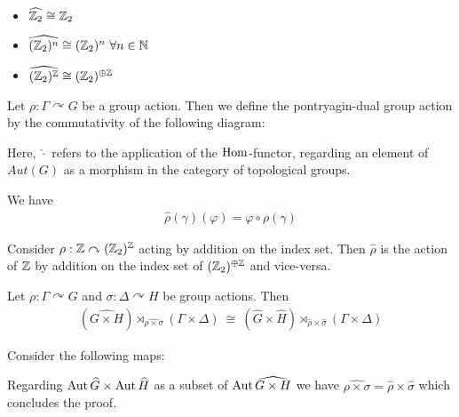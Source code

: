 \begin{Example}
	\label{the_zero_divisor_problem:pontryagin_duality:example_duals}
	\
	\begin{itemize}
		\item {$\widehat{\mathbb{Z}_2} \cong \mathbb{Z}_2$}
		\item {$\widehat{(\mathbb{Z}_2)^n} \cong (\mathbb{Z}_2)^n ~\forall n \in \mathbb{N}$}
		\item {$\widehat{(\mathbb{Z}_2)^{\mathbb{Z}}} \cong (\mathbb{Z}_2)^{\oplus \mathbb{Z}}$}
	\end{itemize}
\end{Example}

\begin{Definition}
	Let $\rho: \Gamma \curvearrowright G$ be a group action.
	Then we define the {pontryagin-dual group action} by the commutativity of the following diagram:
	\begin{figure}[H]
		\centering
		
	\end{figure}
	Here, $\widehat{\cdot}$ refers to the application of the $\operatorname{Hom}$-functor, regarding an element of $Aut(G)$ as a morphism in the category of topological groups.
\end{Definition}
\begin{Remark}
	We have
	\begin{align*}
		\widehat{\rho}(\gamma)(\varphi) = \varphi \circ \rho(\gamma)
	\end{align*}
\end{Remark}
\begin{Example}
	\label{the_zero_divisor_problem:pontryagin_duality:example_dual_action}
	Consider $\rho: \mathbb{Z} \curvearrowright (\mathbb{Z}_2)^{\mathbb{Z}}$ acting by addition on the index set.
	Then $\widehat{\rho}$ is the action of $\mathbb{Z}$ by addition on the index set of $(\mathbb{Z}_2)^{\oplus \mathbb{Z}}$ and vice-versa.
\end{Example}

\begin{Lemma}
	\label{the_zero_divisor_problem:pontryagin_duality:lemma_product_of_dual_group_actions}
	Let $\rho: \Gamma \curvearrowright G$ and $\sigma: \Delta \curvearrowright H$ be group actions. Then
	\begin{align*}
		(\widehat{G \times H}) \rtimes_{\widehat{\rho \times \sigma}} (\Gamma \times \Delta) ~\cong~ (\widehat{G} \times \widehat{H}) \rtimes_{\widehat{\rho} \times \widehat{\sigma}} (\Gamma \times \Delta)
	\end{align*}
\end{Lemma}

\proof
	Consider the following maps:
	\begin{figure}[H]
		\centering
		
	\end{figure}
	Regarding $\operatorname{Aut}{\widehat{G}} \times \operatorname{Aut}{\widehat{H}}$ as a subset of $\operatorname{Aut} \widehat{G \times H}$ we have $\widehat{\rho \times \sigma} = \widehat{\rho} \times \widehat{\sigma}$ which concludes the proof.
\endproof

